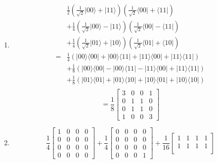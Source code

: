 \documentclass{assignment}
\newcommand{\ket}[1]{\ensuremath{|{#1}\rangle}}
\newcommand{\bra}[1]{\ensuremath{\langle{#1}|}}
\begin{document}
\begin{problemlist}
  \pbitem
  \begin{problem}
  \end{problem}
  \begin{answer}
    \\
    \begin{enumerate}
    \item
      \begin{align*}
        &\frac{1}{2}(\frac{1}{\sqrt{2}}\ket{00}+\ket{11})(\frac{1}{\sqrt{2}}\bra{00}+\bra{11})\\
        &+\frac{1}{4}(\frac{1}{\sqrt{2}}\ket{00}-\ket{11})(\frac{1}{\sqrt{2}}\bra{00}-\bra{11})\\
        &+\frac{1}{4}(\frac{1}{\sqrt{2}}\ket{01}+\ket{10})(\frac{1}{\sqrt{2}}\bra{01}+\bra{10})\\
        =&\frac{1}{4}(\ket{00}\bra{00}+\ket{00}\bra{11}+\ket{11}\bra{00}+\ket{11}\bra{11})\\
        &+\frac{1}{8}(\ket{00}\bra{00}-\ket{00}\bra{11}-\ket{11}\bra{00}+\ket{11}\bra{11})\\
        &+\frac{1}{8}(\ket{01}\bra{01}+\ket{01}\bra{10}+\ket{10}\bra{01}+\ket{10}\bra{10})\\
      \end{align*}    
      \[
      =\frac{1}{8}
      \begin{bmatrix}
        3 & 0 & 0 & 1\\
        0 & 1 & 1 & 0\\
        0 & 1 & 1 & 0\\
        1 & 0 & 0 & 3
      \end{bmatrix}
      \]
    \item
      \[
      \frac{1}{4}
      \begin{bmatrix}
        1 & 0 & 0 & 0\\
        0 & 0 & 0 & 0\\
        0 & 0 & 0 & 0\\
        0 & 0 & 0 & 0
      \end{bmatrix}
      +\frac{1}{4}
      \begin{bmatrix}
        0 & 0 & 0 & 0\\
        0 & 0 & 0 & 0\\
        0 & 0 & 0 & 0\\
        0 & 0 & 0 & 1
      \end{bmatrix}
      +\frac{1}{16}
      \begin{bmatrix}
        1 & 1 & 1 & 1\\
        1 & 1 & 1 & 1\\

\end{bmatrix}\]
\end{enumerate}
\end{answer}
\end{problemlist}
\end{document}
